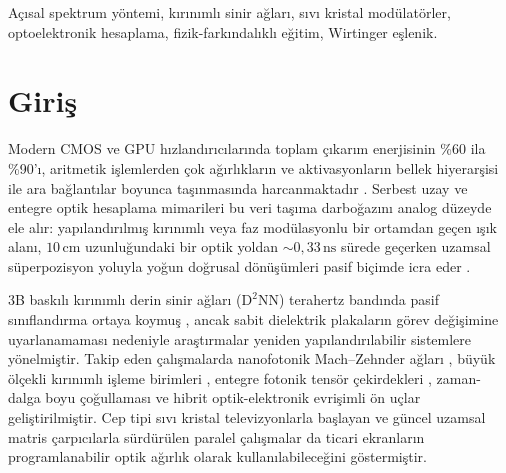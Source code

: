 \documentclass[journal]{IEEEtran}
\begin{document}
\begin{IEEEkeywords}
A\c{c}\i{}sal spektrum y\"ontemi, k\i{}r\i{}n\i{}ml\i{} sinir a\u{g}lar\i{}, s\i{}v\i{} kristal mod\"ulat\"orler, optoelektronik hesaplama, fizik-fark\i{}ndal\i{}kl\i{} e\u{g}itim, Wirtinger e\c{s}lenik.
\end{IEEEkeywords}

\section{Giri\c{s}}

Modern CMOS ve GPU h\i{}zland\i{}r\i{}c\i{}lar\i{}nda toplam \c{c}\i{}kar\i{}m enerjisinin \%60 ila \%90'\i{}, aritmetik i\c{s}lemlerden \c{c}ok a\u{g}\i{}rl\i{}klar\i{}n ve aktivasyonlar\i{}n bellek hiyerar\c{s}isi ile ara ba\u{g}lant\i{}lar boyunca ta\c{s}\i{}nmas\i{}nda harcanmaktad\i{}r \cite{horowitz2014computing,sze2017efficient}. Serbest uzay ve entegre optik hesaplama mimarileri bu veri ta\c{s}\i{}ma darbo\u{g}az\i{}n\i{} analog d\"uzeyde ele al\i{}r: yap\i{}land\i{}r\i{}lm\i{}\c{s} k\i{}r\i{}n\i{}ml\i{} veya faz mod\"ulasyonlu bir ortamdan ge\c{c}en \i{}\c{s}\i{}k alan\i{}, $10\,\text{cm}$ uzunlu\u{g}undaki bir optik yoldan $\sim 0{,}33\,\text{ns}$ s\"urede ge\c{c}erken uzamsal s\"uperpozisyon yoluyla yo\u{g}un do\u{g}rusal d\"on\"u\c{s}\"umleri pasif bi\c{c}imde icra eder \cite{wetzstein2020inference,psaltis1985optical,lin2018alloptical}.

3B bask\i{}l\i{} k\i{}r\i{}n\i{}ml\i{} derin sinir a\u{g}lar\i{} ($\text{D}^2\text{NN}$) terahertz band\i{}nda pasif s\i{}n\i{}fland\i{}rma ortaya koymu\c{s} \cite{lin2018alloptical}, ancak sabit dielektrik plakalar\i{}n g\"orev de\u{g}i\c{s}imine uyarlanamamas\i{} nedeniyle ara\c{s}t\i{}rmalar yeniden yap\i{}land\i{}r\i{}labilir sistemlere y\"onelmi\c{s}tir. Takip eden \c{c}al\i{}\c{s}malarda nanofotonik Mach--Zehnder a\u{g}lar\i{} \cite{shen2017deep}, b\"uy\"uk \"ol\c{c}ekli k\i{}r\i{}n\i{}ml\i{} i\c{s}leme birimleri \cite{zhou2021largescale}, entegre fotonik tens\"or \c{c}ekirdekleri \cite{feldmann2021parallel}, zaman-dalga boyu \c{c}o\u{g}ullamas\i{} \cite{xu2021tops} ve hibrit optik-elektronik evri\c{s}imli \"on u\c{c}lar \cite{chang2018hybrid} geli\c{s}tirilmi\c{s}tir. Cep tipi s\i{}v\i{} kristal televizyonlarla ba\c{s}layan \cite{yu1990lctv} ve g\"uncel uzamsal matris \c{c}arp\i{}c\i{}larla \cite{spall2020reconfigurable} s\"urd\"ur\"ulen paralel \c{c}al\i{}\c{s}malar da ticari ekranlar\i{}n programlanabilir optik a\u{g}\i{}rl\i{}k olarak kullan\i{}labilece\u{g}ini g\"ostermi\c{s}tir.
\end{document}
